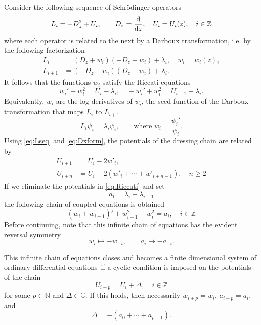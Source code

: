 \documentclass[10pt]{amsart}
\theoremstyle{definition}
\numberwithin{equation}{section}
\numberwithin{figure}{section}
\newcommand{\N}{\mathbb{N}}
\newcommand{\Z}{\mathbb{Z}}
\newcommand{\C}{\mathbb{C}}
\newcommand{\cL}{L}%
\newcommand{\odes}{ordinary differential equations}
\begin{document}
Consider the following sequence of Schr\"{o}dinger operators
\begin{equation}\label{eq:Lseq}
  \cL_i = -D_z^2 + U_i ,\qquad D_z= \frac{{\rm d}}{{\rm d}z},\quad U_i=U_i(z),\quad
  i\in \Z
\end{equation}
where each operator is related to the next by a Darboux transformation, i.e. by the following factorization
\begin{equation}
  \label{eq:Dxform}
  \begin{aligned}
    \cL_i &= (D_z + w_i)(-D_z + w_i)+\lambda_i, \quad w_i = w_i(z),\\
    \cL_{i+1} &= (-D_z + w_i)(D_z + w_i)+\lambda_i.
  \end{aligned}
\end{equation}
It follows that the functions $w_i$ satisfy the Riccati equations
\begin{equation}\label{eq:Riccati}
 w_i' + w_i^2  = U_i - \lambda_i,\quad -w_i' +w_i^2 = U_{i+1}- \lambda_i.
 \end{equation}
Equivalently, $w_i$ are the log-derivatives of $\psi_i$, the seed function of the Darboux transformation that maps $\cL_i$ to $\cL_{i+1}$
\begin{equation}
  \label{eq:Lipsii}
  \cL_i\psi_i = \lambda_i\psi_i,\qquad\text{where } w_i = \frac{\psi_i'}{\psi_i}.
\end{equation}
Using \eqref{eq:Lseq} and \eqref{eq:Dxform}, the potentials of the dressing chain are related by
\begin{align}
  U_{i+1} &= U_i - 2 w'_i, \label{eq:Uplus1}\\
  U_{i+n} &=U_i - 2 \left( w'_i+ \cdots + w'_{i+n-1}\right),\quad
  n\geq 2 \label{eq:Uplusn}
\end{align}
If we eliminate the potentials in \eqref{eq:Riccati} and set
\begin{equation}
  \label{eq:alphaidef}
  a_i =  \lambda_{i} - \lambda_{i+1}
\end{equation}
the following chain of coupled equations is obtained
\[
(w_i + w_{i+1})' + w_{i+1}^2 - w_i^2 = a_i ,\quad i\in \Z
\]
Before continuing, note that this infinite chain of equations has the
evident reversal symmetry
\begin{equation}
  \label{eq:reversal1}
  w_i \mapsto -w_{-i},\qquad a_i \mapsto -a_{-i}.
\end{equation}

This infinite chain of equations closes and becomes a finite
dimensional system of \odes\ if a cyclic condition is imposed on the
potentials of the chain
\begin{equation}\label{eq:shift}
  U_{i+p} = U_i+\Delta,\quad i\in \Z
 \end{equation}
for some $p\in \N$ and $\Delta \in \C$.  If this holds, then
necessarily $w_{i+p}=w_i$, $a_{i+p}=a_i$, and
\begin{equation}
  \label{eq:Deltasumalpha}
 \Delta= -(a_0 + \cdots + a_{p-1}). 
\end{equation}
\end{document}
